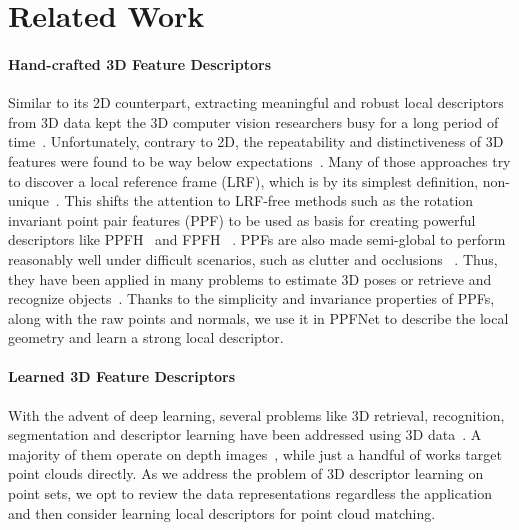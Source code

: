 \documentclass[10pt,twocolumn,letterpaper]{article}
\theoremstyle{break}
\begin{document}
\section{Related Work}
\label{sec:related}
\paragraph{Hand-crafted 3D Feature Descriptors}
Similar to its 2D counterpart, extracting meaningful and robust local descriptors from 3D data kept the 3D computer vision researchers busy for a long period of time~\cite{salti2014shot,rusu2009fast,tombari2010unique,johnson1999using,guo2013rops}. Unfortunately, contrary to 2D, the repeatability and distinctiveness of 3D features were found to be way below expectations~\cite{guo2016comprehensive,guo2014performance,kiforenko2017performance}. Many of those approaches try to discover a local reference frame (LRF), which is by its simplest definition, non-unique~\cite{guo2013rotational}. This shifts the attention to LRF-free methods such as the rotation invariant point pair features (PPF) to be used as basis for creating powerful descriptors like PPFH~\cite{Rusu08IAS} and FPFH ~\cite{rusu2009fast}. PPFs are also made semi-global to perform reasonably well under difficult scenarios, such as clutter and occlusions ~\cite{drost2010model,birdal3dv2015,hinterstoisser2016going,birdal2017cad}. Thus, they have been applied in many problems to estimate 3D poses or retrieve and recognize objects~\cite{rusu2009fast,wahl2003surflet}. Thanks to the simplicity and invariance properties of PPFs, along with the raw points and normals, we use it in PPFNet to describe the local geometry and learn a strong local descriptor.

\paragraph{Learned 3D Feature Descriptors}
With the advent of deep learning, several problems like 3D retrieval, recognition, segmentation and descriptor learning have been addressed using 3D data~\cite{wu20153d,socher2012convolutional}. A majority of them operate on depth images~\cite{kehl2016deep,wohlhart2015learning}, while just a handful of works target point clouds directly. As we address the problem of 3D descriptor learning on point sets, we opt to review the data representations regardless the application and then consider learning local descriptors for point cloud matching.
\end{document}
